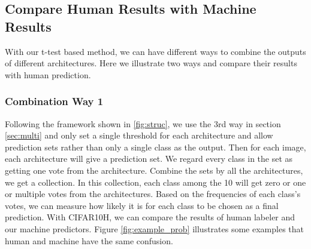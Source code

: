 \documentclass{article}
\begin{document}
\subsection{Compare Human Results with Machine Results}
With our t-test based method, we can have different ways to combine the outputs of different architectures. Here we illustrate two ways and compare their results with human prediction. 

\subsubsection{Combination Way 1 }
Following the framework shown in \ref{fig:struc}, we use the 3rd way in section \ref{sec:multi} and only set a single threshold for each architecture and allow prediction sets rather than only a single class as the output. Then for each image, each architecture will give a prediction set. We regard every class in the set as getting one vote from the architecture. Combine the sets by all the architectures, we get a collection. In this collection, each class among the 10 will get zero or one or multiple votes from the architectures. Based on the frequencies of each class's votes, we can measure how likely it is for each class to be chosen as a final prediction. With CIFAR10H, we can compare the results of human labeler and our machine predictors. Figure \ref{fig:example_prob} illustrates some examples that human and machine have the same confusion.
\end{document}
